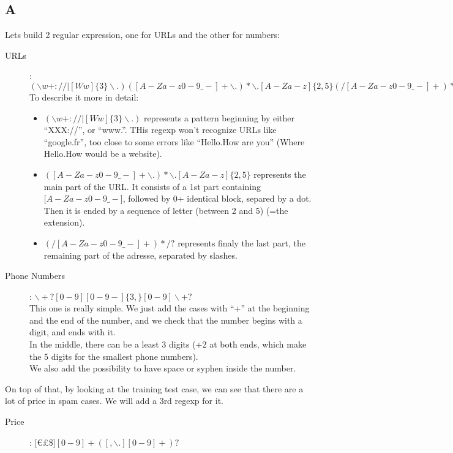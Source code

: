 \documentclass{article}
\begin{document}
        \subsection{A}
            Lets build 2 regular expression, one for URLs and the other for numbers:
            \begin{description}
                \item[URLs]: $(\backslash w+://|[Ww]\{3\}\backslash.)([A-Za-z0-9\_-]+\backslash .)*\backslash .[A-Za-z]\{2,5\}(/[A-Za-z0-9\_-]+)*/?$\\
                    To describe it more in detail:
                    \begin{itemize}
                        \item $(\backslash w+://|[Ww]\{3\}\backslash.)$ represents a pattern beginning by either ``XXX://'', or ``www.''. THis regexp won't recognize URLs like ``google.fr'', too close to some errors like ``Hello.How are you'' (Where Hello.How would be a website).
                        \item $([A-Za-z0-9\_-]+\backslash .)*\backslash .[A-Za-z]\{2,5\}$ represents the main part of the URL. It consists of a 1st part containing $[A-Za-z0-9\_-$], followed by 0+ identical block, separed by a dot. Then it is ended by a sequence of letter (between 2 and 5) (=the extension).
                        \item $(/[A-Za-z0-9\_-]+)*/?$ represents finaly the last part, the remaining part of the adresse, separated by slashes.
                    \end{itemize}
                \item[Phone Numbers]: $\backslash+?[0-9][0-9 -]\{3,\}[0-9]\backslash+?$\\
                    This one is really simple. We just add the cases with ``+'' at the beginning and the end of the number, and we check that the number begins with a digit, and ends with it.\\
                    In the middle, there can be a least 3 digits (+2 at both ends, which make the 5 digits for the smallest phone numbers).\\
                    We also add the possibility to have space or syphen inside the number.
            \end{description}
            On top of that, by looking at the training test case, we can see that there are a lot of price in spam cases. We will add a 3rd regexp for it.
            \begin{description}
                \item[Price]: $[$\euro£\$$][0-9]+([,\backslash.][0-9]+)?$
            \end{description}
\end{document}
